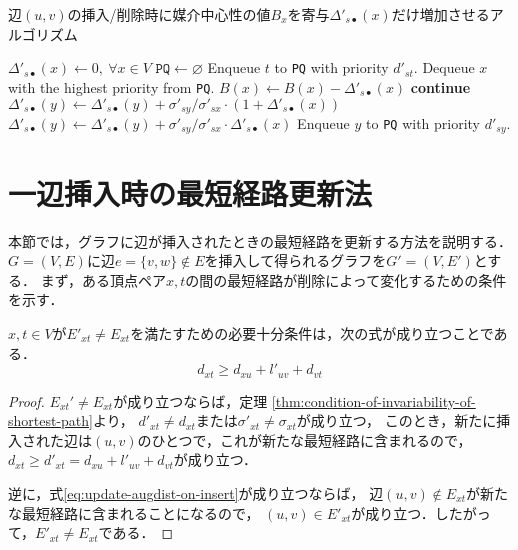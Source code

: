 \begin{algorithm}[tb]
  \caption{辺$(u,v)$の挿入/削除時に媒介中心性の値$B_x$を寄与$\Delta'_{s\bullet}(x)$だけ増加させるアルゴリズム}
  \label{alg:increase-betweenness}
  \begin{algorithmic}[1]\small
    \State $\Delta'_{s\bullet}(x)\gets0,\:\forall x\in V$
    \State $\texttt{PQ}\gets\varnothing$
    \State Enqueue $t$ to \texttt{PQ} with priority $d'_{st}$.
    \EndFor
    \State Dequeue $x$ with the highest priority from \texttt{PQ}.
    \State $B(x)\gets B(x)-\Delta'_{s\bullet}(x)$
    \State \textbf{continue}
    \EndIf
    \State $\Delta'_{s\bullet}(y)\gets\Delta'_{s\bullet}(y)+\sigma'_{sy}/\sigma'_{sx}\cdot(1+\Delta'_{s\bullet}(x))$
    \Else
    \State $\Delta'_{s\bullet}(y)\gets\Delta'_{s\bullet}(y)+\sigma'_{sy}/\sigma'_{sx}\cdot\Delta'_{s\bullet}(x)$
    \EndIf
    \State Enqueue $y$ to \texttt{PQ} with priority $d'_{sy}$.
    \EndIf
    \EndFor
    \EndWhile
    \EndProcedure
  \end{algorithmic}
\end{algorithm}

\section{一辺挿入時の最短経路更新法}
\label{sect:update-apsp-on-insert}
本節では，グラフに辺が挿入されたときの最短経路を更新する方法を説明する．
$G=(V,E)$に辺$e=\{v,w\} \not\in E$を挿入して得られるグラフを$G'=(V,E')$とする．
まず，ある頂点ペア$x,t$の間の最短経路が削除によって変化するための条件を示す．

\begin{lemma}
  \label{lmm:update-augdist-on-insert}
  $x,t\in V$が$E'_{xt}\neq E_{xt}$を満たすための必要十分条件は，次の式が成り立つことである．
  \begin{equation}
    d_{xt}\geq d_{xu}+l'_{uv}+d_{vt}
    \label{eq:update-augdist-on-insert}
  \end{equation}
\end{lemma}
\begin{proof}
  $E_{xt}'\neq E_{xt}$が成り立つならば，定理
  \ref{thm:condition-of-invariability-of-shortest-path}より，
  $d'_{xt}\neq d_{xt}$または$\sigma'_{xt}\neq\sigma_{xt}$が成り立つ，
  このとき，新たに挿入された辺は$(u,v)$のひとつで，これが新たな最短経路に含まれるので，
  $d_{xt}\geq d'_{xt}=d_{xu}+l'_{uv}+d_{vt}$が成り立つ．

  逆に，式\eqref{eq:update-augdist-on-insert}が成り立つならば，
  辺$(u,v)\notin E_{xt}$が新たな最短経路に含まれることになるので，
  $(u,v)\in E'_{xt}$が成り立つ．したがって，$E'_{xt}\neq E_{xt}$である．
\end{proof}

